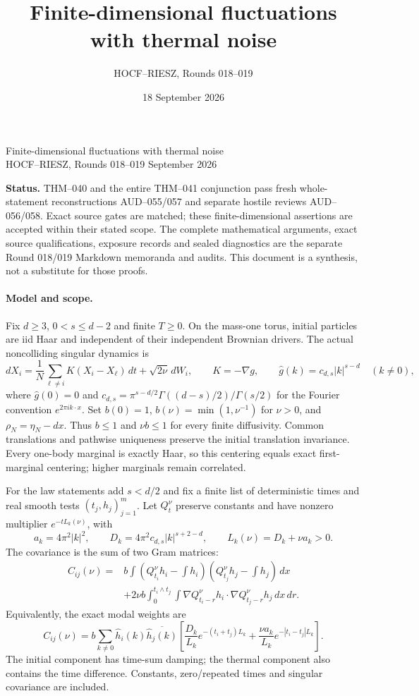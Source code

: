 \documentclass[10pt]{article}
\begin{document}
\title{Finite-dimensional fluctuations with thermal noise}
\author{HOCF--RIESZ, Rounds 018--019}
\date{18 September 2026}
\begin{center}
{\Large Finite-dimensional fluctuations with thermal noise}\\[4pt]
HOCF--RIESZ, Rounds 018--019  September 2026
\end{center}
\noindent\textbf{Status.} THM--040 and the entire THM--041 conjunction pass fresh whole-statement reconstructions AUD--055/057 and separate hostile reviews AUD--056/058. Exact source gates are matched; these finite-dimensional assertions are accepted within their stated scope. The complete mathematical arguments, exact source qualifications, exposure records and sealed diagnostics are the separate Round 018/019 Markdown memoranda and audits. This document is a synthesis, not a substitute for those proofs.

\paragraph{Model and scope.}
Fix $d\ge3$, $0<s\le d-2$ and finite $T\ge0$. On the mass-one torus, initial particles are iid Haar and independent of their independent Brownian drivers. The actual noncolliding singular dynamics is
\[
 dX_i=\frac1N\sum_{\ell\ne i}K(X_i-X_\ell)\,dt+\sqrt{2\nu}\,dW_i,
 \qquad K=-\nabla g,
 \qquad \widehat g(k)=c_{d,s}|k|^{s-d}\quad(k\ne0),
\]
where $\widehat g(0)=0$ and
$c_{d,s}=\pi^{s-d/2}\Gamma((d-s)/2)/\Gamma(s/2)$ for the Fourier convention $e^{2\pi i k\cdot x}$.
Set $b(0)=1$, $b(\nu)=\min(1,\nu^{-1})$ for $\nu>0$, and
$\rho_N=\eta_N-dx$. Thus $b\le1$ and $\nu b\le1$ for every finite diffusivity.
Common translations and pathwise uniqueness preserve the initial translation invariance. Every one-body marginal is exactly Haar, so this centering equals exact first-marginal centering; higher marginals remain correlated.

For the law statements add $s<d/2$ and fix a finite list of deterministic times and real smooth tests $(t_j,h_j)_{j=1}^m$.
Let $Q_t^\nu$ preserve constants and have nonzero multiplier $e^{-tL_k(\nu)}$, with
\[
 a_k=4\pi^2|k|^2,\qquad
 D_k=4\pi^2c_{d,s}|k|^{s+2-d},\qquad L_k(\nu)=D_k+\nu a_k>0.
\]
The covariance is the sum of two Gram matrices:
\begin{align*}
 C_{ij}(\nu)={}&b\int(Q_{t_i}^\nu h_i-\textstyle\int h_i)
                        (Q_{t_j}^\nu h_j-\textstyle\int h_j)\,dx\\
 &+2\nu b\int_0^{t_i\wedge t_j}\int
             \nabla Q_{t_i-r}^\nu h_i\cdot\nabla Q_{t_j-r}^\nu h_j\,dx\,dr.
\end{align*}
Equivalently, the exact modal weights are
\[
 C_{ij}(\nu)=b\sum_{k\ne0}\widehat h_i(k)\overline{\widehat h_j(k)}
 \left[\frac{D_k}{L_k}e^{-(t_i+t_j)L_k}
       +\frac{\nu a_k}{L_k}e^{-|t_i-t_j|L_k}\right].
\]
The initial component has time-sum damping; the thermal component also contains the time difference. Constants, zero/repeated times and singular covariance are included.
\end{document}
